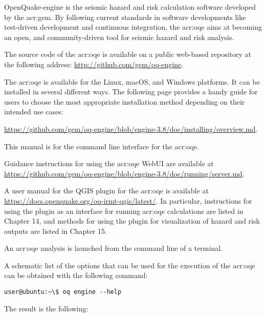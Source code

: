 OpenQuake-engine is the seismic hazard and risk calculation software developed by
the \glsdesc{acr:gem}. By following current standards in software
developments like test-driven development and continuous integration, the
\glsdesc{acr:oqe} aims at becoming an open, and community-driven tool for
seismic hazard and risk analysis.

The source code of the \glsdesc{acr:oqe} is available on a public web-based
repository at the following address:
\href{http://github.com/gem/oq-engine}{http://github.com/gem/oq-engine}.

The \glsdesc{acr:oqe} is available for the Linux, macOS, and Windows
platforms. It can be installed in several different ways. The following page
provides a handy guide for users to choose the most appropriate installation
method depending on their intended use cases:

\href{https://github.com/gem/oq-engine/blob/engine-3.8/doc/installing/overview.md}{https://github.com/gem/oq-engine/blob/engine-3.8/doc/installing/overview.md}.

This manual is for the command line interface for the \glsdesc{acr:oqe}. 

Guidance instructions for using the \glsdesc{acr:oqe} WebUI are available 
at \href{https://github.com/gem/oq-engine/blob/engine-3.8/doc/running/server.md}{https://github.com/gem/oq-engine/blob/engine-3.8/doc/running/server.md}.

A user manual for the QGIS plugin for the \glsdesc{acr:oqe} is available at 
\href{https://docs.openquake.org/oq-irmt-qgis/latest/}{https://docs.openquake.org/oq-irmt-qgis/latest/}. 
In particular, instructions for using the plugin as an interface for running \glsdesc{acr:oqe}
calculations are listed in Chapter 14, and methods for using the plugin for visualization 
of hazard and risk outputs are listed in Chapter 15.

An \gls{acr:oqe} analysis is launched from the command line of a terminal.

A schematic list of the options that can be used for the execution of the
\gls{acr:oqe} can be obtained with the following command:

\begin{verbatim}
user@ubuntu:~\$ oq engine --help
\end{verbatim}

The result is the following:
\inputminted[firstline=1,fontsize=\footnotesize,frame=single]{shell-session}{oqum/help.txt}
